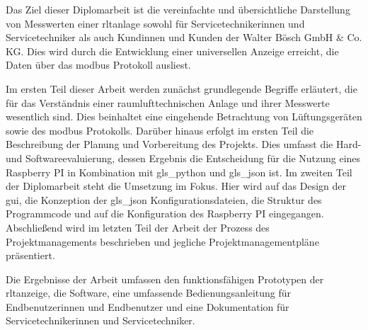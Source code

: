 \noindent Das Ziel dieser Diplomarbeit ist die vereinfachte und übersichtliche Darstellung von Messwerten einer \acf{rltanlage} sowohl für Servicetechnikerinnen und Servicetechniker als auch Kundinnen und Kunden der Walter Bösch GmbH \& Co. KG. Dies wird durch die Entwicklung einer universellen Anzeige erreicht, die Daten über das \gls{modbus} Protokoll ausliest. 

Im ersten Teil dieser Arbeit werden zunächst grundlegende Begriffe erläutert, die für das Verständnis einer raumlufttechnischen Anlage und ihrer Messwerte wesentlich sind. Dies beinhaltet eine eingehende Betrachtung von Lüftungsgeräten sowie des \gls{modbus} Protokolls. Darüber hinaus erfolgt im ersten Teil die Beschreibung der Planung und Vorbereitung des Projekts. Dies umfasst die Hard- und Softwareevaluierung, dessen Ergebnis die Entscheidung für die Nutzung eines Raspberry PI in Kombination mit \gls{gls_python} und \gls{gls_json} ist. 
\newline Im zweiten Teil der Diplomarbeit steht die Umsetzung im Fokus. Hier wird auf das Design der \acf{gui}, die Konzeption der \gls{gls_json} Konfigurationsdateien, die Struktur des Programmcode und auf die Konfiguration des Raspberry PI eingegangen. 
\newline Abschließend wird im letzten Teil der Arbeit der Prozess des Projektmanagements beschrieben und jegliche Projektmanagementpläne präsentiert.

Die Ergebnisse der Arbeit umfassen den funktionsfähigen Prototypen der \acs{rltanzeige}, die Software, eine umfassende Bedienungsanleitung für Endbenutzerinnen und Endbenutzer und eine Dokumentation für Servicetechnikerinnen und Servicetechniker.


\noindent 













